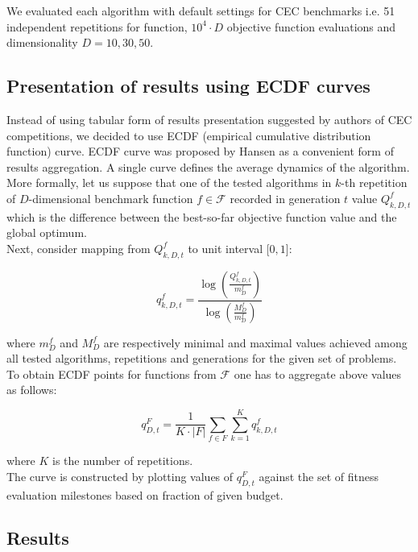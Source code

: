 \documentclass[runningheads,a4paper]{llncs}
\newcommand{\ffrac}[2]{\ensuremath{\frac{\displaystyle #1}{\displaystyle #2}}}
\begin{document}
We evaluated each algorithm with default settings for CEC benchmarks i.e. 51 independent repetitions for function, $10^{4}\cdot D$ objective function evaluations and dimensionality $D = 10, 30, 50$.

\subsection{Presentation of results using ECDF curves}

Instead of using tabular form of results presentation suggested by authors of CEC competitions, we decided to use ECDF (empirical cumulative distribution function) curve.
ECDF curve was proposed by Hansen \cite{Hansen-ecdf} as a convenient form of results aggregation. A single curve defines the average dynamics of the algorithm.
\\
More formally, let us suppose that one of the tested algorithms in $k$-th repetition of $D$-dimensional benchmark function $f \in \mathcal{F}$ recorded in generation $t$ value $Q^{f}_{k, D, t}$ 
which is the difference between the best-so-far objective function value and the global optimum. \\
Next, consider mapping from $Q^{f}_{k, D, t}$ to unit interval $[0, 1$]:

\begin{equation}
  q^{f}_{k, D, t} = \ffrac{\log\left(\frac{Q^{f}_{k, D, t}}{m^{f}_{D}}\right)}{\log\left(\frac{M^{f}_{D}}{m^{f}_{D}}\right)}
\end{equation}

where $m^{f}_{D}$ and $M^{f}_{D}$ are respectively minimal and maximal values achieved among all tested algorithms, repetitions and generations for the given set of problems. \\

To obtain ECDF points for functions from $\mathcal{F}$ one has to aggregate above values as follows:

\begin{equation}
  q^{F}_{D, t} = \frac{1}{K \cdot |F|}\sum_{f \in F} \sum^{K}_{k = 1} q^{f}_{k, D, t}  
\end{equation}

where $K$ is the number of repetitions.\\
The curve is constructed by plotting values of $q^{F}_{D, t}$ against the set of fitness evaluation milestones based on fraction of given budget. 

\subsection{Results}
\end{document}
